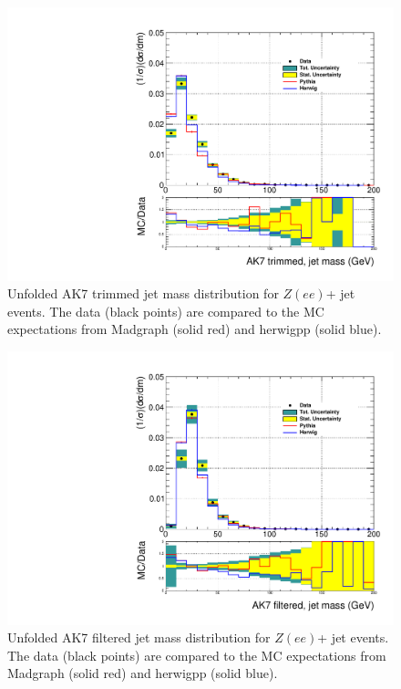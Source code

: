 \begin{figure}[!htb]
\centering\includegraphics[width=1.\textwidth]{figs/Zee/jetmassunf_ak7tr_allpT.pdf}
\caption{Unfolded AK7 trimmed jet mass distribution for $Z(ee)$+ jet events. The data (black points) are compared to the MC expectations from Madgraph (solid red) and herwigpp (solid blue).}
\label{figs:AK7ZeeInt3}
\end{figure}


\begin{figure}[!htb]
\centering\includegraphics[width=1.\textwidth]{figs/Zee/jetmassunf_ak7ft_allpT.pdf}
\caption{Unfolded AK7 filtered jet mass distribution for $Z(ee)$+ jet events. The data (black points) are compared to the MC expectations from Madgraph (solid red) and herwigpp (solid blue).}
\label{figs:AK7ZeeInt4}
\end{figure}


